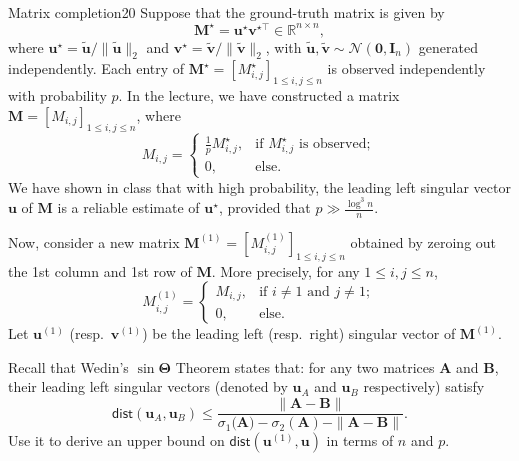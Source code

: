 \documentclass{article}
\begin{document}
\begin{problem}{Matrix completion}{20}
Suppose that the ground-truth matrix is given by
\[
\bm{M}^\star=\bm{u}^\star\bm{v}^{\star\top}\in\mathbb{R}^{n\times n},
\]
where $\bm{u}^\star=\tilde{\bm{u}}/\|\tilde{\bm{u}}\|_{2}$ and $\bm{v}^\star=\tilde{\bm{v}}/\|\tilde{\bm{v}}\|_{2}$,
with $\tilde{\bm{u}},\tilde{\bm{v}}\sim\mathcal{N}(\bm{0}, \bm{I}_{n})$
generated independently. Each entry of $\bm{M}^\star=[M^\star_{i,j}]_{1\leq i,j\leq n}$
is observed independently with probability $p$. In the lecture,
we have constructed a matrix ${\bm{M}}=[{M}_{i,j}]_{1\leq i,j\leq n}$,
where
\[
{M}_{i,j}=\begin{cases}
\frac{1}{p}M^\star_{i,j}, & \text{if }M^\star_{i,j}\text{ is observed};\\
0, & \text{else}.
\end{cases}
\]
We have shown in class that with high probability, the leading left singular vector ${\bm{u}}$
of ${\bm{M}}$ is a reliable estimate of $\bm{u}^\star$, provided that
$p\gg\frac{\log^{3}n}{n}$.


	Now, consider a new matrix ${\bm{M}}^{(1)}=[{M}_{i,j}^{(1)}]_{1\leq i,j\leq n}$ obtained by zeroing out the 1st column and 1st row of ${\bm{M}}$. More precisely, for any $1\leq i,j\leq n$, 
\[
{M}_{i,j}^{(1)}=\begin{cases}
{M}_{i,j}, & \text{if }i\neq1\text{ and }j\neq1;\\
0, & \text{else}.
\end{cases}
\]
Let ${\bm{u}}^{(1)}$ (resp.~${\bm{v}}^{(1)}$) be the leading left (resp.~right) singular vector of ${\bm{M}}^{(1)}$. 

	 Recall that  Wedin's $\sin\bm{\Theta}$ Theorem states that: for any two matrices $\bm{A}$ and $\bm{B}$, their leading left singular vectors (denoted by $\bm{u}_A$ and $\bm{u}_B$ respectively) satisfy
%
\[
	\mathsf{dist}(\bm{u}_A, \bm{u}_B)\leq\frac{\big\|\bm{A}-\bm{B}\big\|}{\sigma_{1}\big(\bm{A}\big)-\sigma_2(\bm{A}) -\|\bm{A}-\bm{B}\|}.
\]
Use it to derive an upper bound on $\mathsf{dist}({\bm{u}}^{(1)},{\bm{u}})$ in terms of $n$ and $p$. 

\solution{
%


}
\end{problem}
\end{document}
